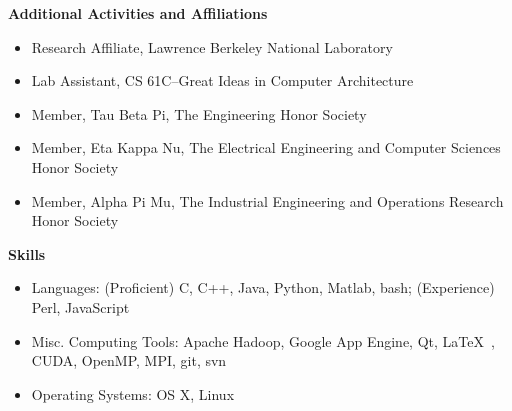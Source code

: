 \documentclass[letterpaper,11pt]{article}
\newcommand{\desitem}[1]{\item #1 \vspace{-7pt}}
\newcommand{\resheading}[1]{{\large \colorbox{mygrey}{\begin{minipage}{\textwidth}{\textbf{#1 \vphantom{p\^{E}}}}\end{minipage}}}}
\begin{document}
\resheading{Additional Activities and Affiliations}
\begin{itemize}
    \desitem{Research Affiliate,
    Lawrence Berkeley National Laboratory}
   \desitem{Lab Assistant,
    CS 61C--Great Ideas in Computer Architecture}    
    \desitem{Member,
    Tau Beta Pi, The Engineering Honor Society}
     \desitem{Member,
    Eta Kappa Nu, The Electrical Engineering and Computer Sciences Honor Society}
    \desitem{Member,
    Alpha Pi Mu, The Industrial Engineering and Operations Research Honor Society}
\end{itemize}

\vspace{0.1in}

\resheading{Skills}
\begin{itemize}
    \desitem{Languages:
                    (Proficient) C, C++, Java, Python, Matlab, bash; (Experience) Perl, JavaScript}
    \desitem{Misc. Computing Tools:
                     Apache Hadoop, Google App Engine, Qt, \LaTeX\ , CUDA, OpenMP, MPI, git, svn}
    \desitem{Operating Systems:
                     OS X, Linux}
\end{itemize}
\end{document}
